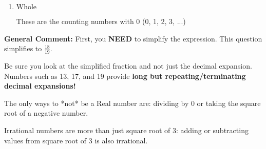 \documentclass{extbook}[14pt]
\begin{document}
\begin{enumerate}
{\begin{enumerate}[label=\Alph*.]
These cannot be written as a fraction of Integers.
\item \( \text{Whole} \)

These are the counting numbers with 0 (0, 1, 2, 3, ...)
\end{enumerate}

\textbf{General Comment:} First, you \textbf{NEED} to simplify the expression. This question simplifies to $\frac{18}{19}$. 
 
 Be sure you look at the simplified fraction and not just the decimal expansion. Numbers such as 13, 17, and 19 provide \textbf{long but repeating/terminating decimal expansions!} 
 
 The only ways to *not* be a Real number are: dividing by 0 or taking the square root of a negative number. 
 
 Irrational numbers are more than just square root of 3: adding or subtracting values from square root of 3 is also irrational.
}
\end{enumerate}
\end{document}
